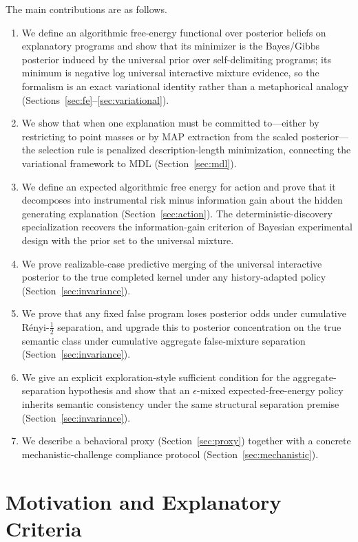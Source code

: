 \documentclass[11pt]{article}
\theoremstyle{remark}
\begin{document}
The main contributions are as follows.
\begin{enumerate}
\item We define an algorithmic free-energy functional over posterior beliefs on explanatory programs and show that its minimizer is the Bayes/Gibbs posterior induced by the universal prior over self-delimiting programs; its minimum is negative log universal interactive mixture evidence, so the formalism is an exact variational identity rather than a metaphorical analogy (Sections~\ref{sec:fe}--\ref{sec:variational}).
\item We show that when one explanation must be committed to---either by restricting to point masses or by MAP extraction from the scaled posterior---the selection rule is penalized description-length minimization, connecting the variational framework to MDL (Section~\ref{sec:mdl}).
\item We define an expected algorithmic free energy for action and prove that it decomposes into instrumental risk minus information gain about the hidden generating explanation (Section~\ref{sec:action}). The deterministic-discovery specialization recovers the information-gain criterion of Bayesian experimental design \citep{Lindley1956} with the prior set to the universal mixture.
\item We prove realizable-case predictive merging of the universal interactive posterior to the true completed kernel under any history-adapted policy (Section~\ref{sec:invariance}).
\item We prove that any fixed false program loses posterior odds under cumulative R\'enyi-\(\frac12\) separation, and upgrade this to posterior concentration on the true semantic class under cumulative aggregate false-mixture separation (Section~\ref{sec:invariance}).
\item We give an explicit exploration-style sufficient condition for the aggregate-separation hypothesis and show that an \(\epsilon\)-mixed expected-free-energy policy inherits semantic consistency under the same structural separation premise (Section~\ref{sec:invariance}).
\item We describe a behavioral proxy (Section~\ref{sec:proxy}) together with a concrete mechanistic-challenge compliance protocol (Section~\ref{sec:mechanistic}).
\end{enumerate}

\section{Motivation and Explanatory Criteria}
\label{sec:motivation}
\end{document}
